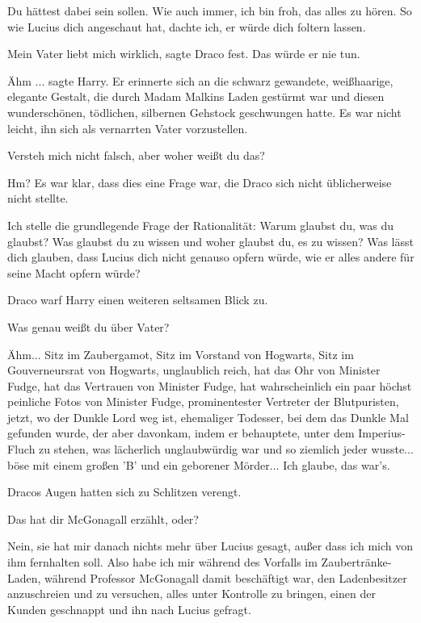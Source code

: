 \glqq Du hättest dabei sein sollen. Wie auch immer, ich bin froh, das alles zu
hören. So wie Lucius dich angeschaut hat, dachte ich, er würde dich foltern
lassen.\grqq{}

\glqq Mein Vater liebt mich wirklich\grqq{}, sagte Draco fest. \glqq Das würde
er nie tun.\grqq{}

\glqq Ähm ...\grqq{} sagte Harry. Er erinnerte sich an die schwarz gewandete,
weißhaarige, elegante Gestalt, die durch Madam Malkins Laden gestürmt war und
diesen wunderschönen, tödlichen, silbernen Gehstock geschwungen hatte. Es war
nicht leicht, ihn sich als vernarrten Vater vorzustellen.

\glqq Versteh mich nicht falsch, aber woher weißt du das?\grqq{}

\glqq Hm?\grqq{} Es war klar, dass dies eine Frage war, die Draco sich nicht
üblicherweise nicht stellte.

\glqq Ich stelle die grundlegende Frage der Rationalität: Warum glaubst du, was
du glaubst? Was glaubst du zu wissen und woher glaubst du, es zu wissen? Was
lässt dich glauben, dass Lucius dich nicht genauso opfern würde, wie er alles
andere für seine Macht opfern würde?\grqq{}

Draco warf Harry einen weiteren seltsamen Blick zu.

\glqq Was genau weißt du über Vater?\grqq{}

\glqq Ähm... Sitz im Zaubergamot, Sitz im Vorstand von Hogwarts, Sitz im
Gouverneursrat von Hogwarts, unglaublich reich, hat das Ohr von Minister Fudge,
hat das Vertrauen von Minister Fudge, hat wahrscheinlich ein paar höchst
peinliche Fotos von Minister Fudge, prominentester Vertreter der Blutpuristen,
jetzt, wo der Dunkle Lord weg ist, ehemaliger Todesser, bei dem das Dunkle Mal
gefunden wurde, der aber davonkam, indem er behauptete, unter dem Imperius-Fluch
zu stehen, was lächerlich unglaubwürdig war und so ziemlich jeder wusste... böse
mit einem großen 'B' und ein geborener Mörder... Ich glaube, das war's.\grqq{}

Dracos Augen hatten sich zu Schlitzen verengt.

\glqq Das hat dir McGonagall erzählt, oder?\grqq{}

\glqq Nein, sie hat mir danach nichts mehr über Lucius gesagt, außer dass ich
mich von ihm fernhalten soll. Also habe ich mir während des Vorfalls im
Zaubertränke-Laden, während Professor McGonagall damit beschäftigt war, den
Ladenbesitzer anzuschreien und zu versuchen, alles unter Kontrolle zu bringen,
einen der Kunden geschnappt und ihn nach Lucius gefragt.\grqq{}

